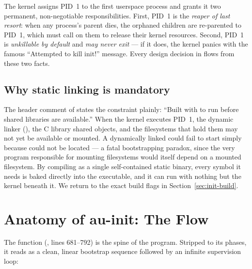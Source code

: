 \begin{infobox}
The kernel assigns PID~1 to the first userspace process and grants it two
permanent, non-negotiable responsibilities. First, PID~1 is the
\emph{reaper of last resort}: when any process's parent dies, the orphaned
children are re-parented to PID~1, which must call  on them to
release their kernel resources. Second, PID~1 is \emph{unkillable by default} and
\emph{may never exit} --- if it does, the kernel panics with the famous
``Attempted to kill init!'' message. Every design decision in 
flows from these two facts.
\end{infobox}

\subsection{Why static linking is mandatory}

The header comment of  states the constraint plainly:
``Built with  to run before shared libraries are available.''
When the kernel executes PID~1, the dynamic linker (), the C library
shared objects, and the filesystems that hold them may not yet be available or
mounted. A dynamically linked  could fail to start simply because
 could not be located --- a fatal bootstrapping paradox, since the
very program responsible for mounting filesystems would itself depend on a
mounted filesystem. By compiling  as a single self-contained
static binary, every symbol it needs is baked directly into the executable, and
it can run with nothing but the kernel beneath it. We return to the exact
build flags in Section~\ref{sec:init-build}.

\section{Anatomy of au-init: The \texorpdfstring{}{main()} Flow}

The  function (, lines 681--792) is the spine of the
program. Stripped to its phases, it reads as a clean, linear bootstrap sequence
followed by an infinite supervision loop:

